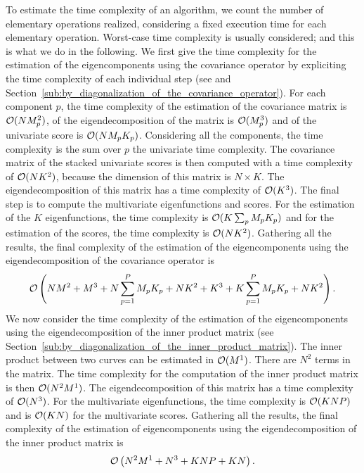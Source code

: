 To estimate the time complexity of an algorithm, we count the number of elementary operations realized, considering a fixed execution time for each elementary operation. Worst-case time complexity is usually considered; and this is what we do in the following. We first give the time complexity for the estimation of the eigencomponents using the covariance operator by expliciting the time complexity of each individual step (see \cite{happMultivariateFunctionalPrincipal2015} and Section~\ref{sub:by_diagonalization_of_the_covariance_operator}). For each component $p$, the time complexity of the estimation of the covariance matrix is $\operatorname{\mathcal{O}}(NM_p^2)$, of the eigendecomposition of the matrix is $\operatorname{\mathcal{O}}(M_p^3)$ and of the univariate score is $\operatorname{\mathcal{O}}(NM_pK_p)$. Considering all the components, the time complexity is the sum over $p$ the univariate time complexity. The covariance matrix of the stacked univariate scores is then computed with a time complexity of $\operatorname{\mathcal{O}}(NK^2)$, because the dimension of this matrix is $N \times K$. The eigendecomposition of this matrix has a time complexity of $\operatorname{\mathcal{O}}(K^3)$. The final step is to compute the multivariate eigenfunctions and scores. For the estimation of the $K$ eigenfunctions, the time complexity is $\operatorname{\mathcal{O}}(K\sum_{p} M_pK_p)$ and for the estimation of the scores, the time complexity is $\operatorname{\mathcal{O}}(NK^2)$. Gathering all the results, the final complexity of the estimation of the eigencomponents using the eigendecomposition of the covariance operator is
\begin{equation}\label{eq:time_compl_cov}
    \operatorname{\mathcal{O}}\left(NM^2 + M^3 + N\sum_{p = 1}^P M_pK_p + NK^2 + K^3 + K\sum_{p = 1}^P M_pK_p + NK^2\right).
\end{equation}
We now consider the time complexity of the estimation of the eigencomponents using the eigendecomposition of the inner product matrix (see Section~\ref{sub:by_diagonalization_of_the_inner_product_matrix}). The inner product between two curves can be estimated in $\operatorname{\mathcal{O}}(M^1)$. There are $N^2$ terms in the matrix. The time complexity for the computation of the inner product matrix is then $\operatorname{\mathcal{O}}(N^2M^1)$. The eigendecomposition of this matrix has a time complexity of $\operatorname{\mathcal{O}}(N^3)$. For the multivariate eigenfunctions, the time complexity is $\operatorname{\mathcal{O}}(KNP)$ and is $\operatorname{\mathcal{O}}(KN)$ for the multivariate scores. Gathering all the results, the final complexity of the estimation of eigencomponents using the eigendecomposition of the inner product matrix is
\begin{equation}\label{eq:time_compl_in_prod}
    \operatorname{\mathcal{O}}\left(N^2M^1 + N^3 + KNP + KN\right).
\end{equation}

